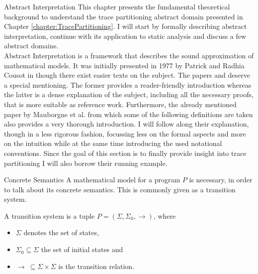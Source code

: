 \begin{chapter}{Abstract Interpretation}
	\label{chapter:AbstractInterpretation}
	This chapter presents the fundamental theoretical background to understand the trace partitioning abstract domain presented in Chapter \ref{chapter:TracePartitioning}. I will start by formally describing abstract interpretation, continue with its application to static analysis and discuss a few abstract domains.\\

	Abstract Interpretation is a framework that describes the sound approximation of mathematical models. It was initially presented in 1977 by Patrick and Radhia Cousot in \cite{cousot:cousot77} though there exist easier texts on the subject. The papers \cite{cousot01} and \cite{cousot:cousot04} deserve a special mentioning. The former provides a reader-friendly introduction whereas the latter is a dense explanation of the subject, including all the necessary proofs, that is more suitable as reference work. Furthermore, the already mentioned paper by Mauborgne et al. \cite{mauborgne:rival05} from which some of the following definitions are taken also provides a very thorough introduction. I will follow along their explanation, though in a less rigorous fashion, focussing less on the formal aspects and more on the intuition while at the same time introducing the used notational conventions. Since the goal of this section is to finally provide insight into trace partitioning I will also borrow their running example.

	
	\begin{section}{Concrete Semantics}
		A mathematical model for a program $P$ is necessary, in order to talk about its concrete semantics. This is commonly given as a transition system.

		\begin{definition}
			\label{definition:transitionsystem}
			A transition system is a tuple $P = (\Sigma, \Sigma_0, \to)$, where 
			\begin{itemize}
				\item $\Sigma$ denotes the set of states,
				\item $\Sigma_0 \subseteq \Sigma$ the set of initial states and
				\item $\to \ \subseteq \Sigma \times \Sigma$ is the transition relation.
			\end{itemize}
		\end{definition}


\end{section}
\end{chapter}
